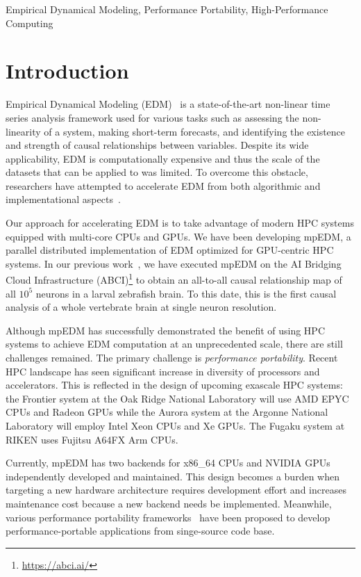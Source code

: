 \documentclass[conference]{IEEEtran}
\begin{document}
\begin{IEEEkeywords}
    Empirical Dynamical Modeling, Performance Portability, High-Performance
    Computing
\end{IEEEkeywords}

\section{Introduction}

Empirical Dynamical Modeling (EDM)~\cite{Chang2017} is a state-of-the-art
non-linear time series analysis framework used for various tasks such as
assessing the non-linearity of a system, making short-term forecasts, and
identifying the existence and strength of causal relationships between
variables. Despite its wide applicability, EDM is computationally expensive
and thus the scale of the datasets that can be applied to was limited. To
overcome this obstacle, researchers have attempted to accelerate EDM  from
both algorithmic and implementational aspects~\cite{Pu2019,Ma2014}.

Our approach for accelerating EDM is to take advantage of modern HPC systems
equipped with multi-core CPUs and GPUs. We have been developing mpEDM, a
parallel distributed implementation of EDM optimized for GPU-centric HPC
systems. In our previous work~\cite{mpedm}, we have executed mpEDM on
the AI Bridging Cloud Infrastructure (ABCI)\footnote{\url{https://abci.ai/}}
to obtain an all-to-all causal relationship map of all $10^5$ neurons in a
larval zebrafish brain. To this date, this is the first causal analysis of a
whole vertebrate brain at single neuron resolution.

Although mpEDM has successfully demonstrated the benefit of using HPC systems
to achieve EDM computation at an unprecedented scale, there are still
challenges remained. The primary challenge is \textit{performance portability}.
Recent HPC landscape has seen significant increase in diversity of processors
and accelerators. This is reflected in the design of upcoming exascale HPC
systems: the Frontier system at the Oak Ridge National Laboratory will use AMD
EPYC CPUs and Radeon GPUs while the Aurora system at the Argonne National
Laboratory will employ Intel Xeon CPUs and Xe GPUs. The Fugaku system at RIKEN
uses Fujitsu A64FX Arm CPUs.

Currently, mpEDM has two backends for x86\_64 CPUs and NVIDIA GPUs
independently developed and maintained. This design becomes a burden when
targeting a new hardware architecture requires development effort and
increases maintenance cost because a new backend needs be implemented.
Meanwhile, various performance portability frameworks~\cite{Deakin2019,
Deakin2020} have been proposed to develop performance-portable applications
from singe-source code base.
\end{document}
